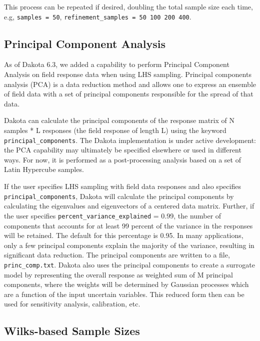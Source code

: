 \begin{enumerate}
  This process can be repeated if desired, doubling the total sample
  size each time, e.g, \texttt{samples = 50},
  \texttt{refinement\_samples = 50  100  200  400}.

\end{enumerate}

\subsection{Principal Component Analysis} 
As of Dakota 6.3, we added a capability to perform 
Principal Component Analysis on field response data when 
using LHS sampling.  Principal components analysis (PCA) 
is a data reduction method and allows one to express an 
ensemble of field data with a set of principal components 
responsible for the spread of that data.

Dakota can calculate the principal components of the response matrix of
N samples * L responses (the field response of length L) 
using the keyword \texttt{principal\_components}.
The Dakota implementation is under active development:  the PCA capability
may ultimately be specified elsewhere or used in different ways.
For now, it is performed as a post-processing analysis based on a set of 
Latin Hypercube samples.
 
If the user specifies LHS sampling with field data responses and also 
specifies \texttt{principal\_components}, Dakota will calculate the principal
components by calculating the eigenvalues and eigenvectors of a centered 
data matrix.   
Further, if the user specifies \texttt{percent\_variance\_explained} = 0.99, 
the number of components that accounts for at least 99 percent of the variance 
in the responses will be retained.  The default for this percentage is 0.95.  
In many applications, only a few principal components explain the majority 
of the variance, resulting in significant data reduction.
The principal components are written to a file, \texttt{princ\_comp.txt}.
Dakota also uses the principal components to create a surrogate model by 
representing the overall response as weighted sum of M principal components, 
where the weights will be determined by Gaussian processes which are a function 
of the input uncertain variables.  This reduced form then can be used for 
sensitivity analysis, calibration, etc.  

\subsection{Wilks-based Sample Sizes}\label{uq:wilks}

